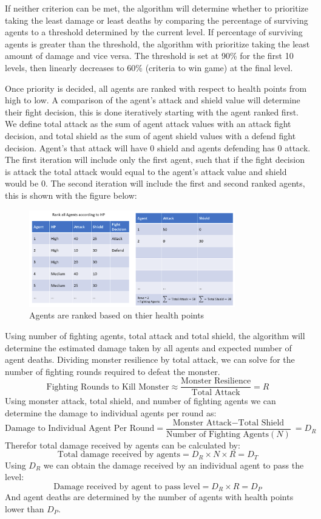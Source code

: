 If neither criterion can be met, the algorithm will determine whether to prioritize taking the least damage or least deaths by comparing the percentage of surviving agents to a threshold determined by the current level. If percentage of surviving agents is greater than the threshold, the algorithm with prioritize taking the least amount of damage and vice versa. The threshold is set at 90\% for the first 10 levels, then linearly decreases to 60\% (criteria to win game) at the final level.

Once priority is decided, all agents are ranked with respect to health points from high to low. A comparison of the agent's attack and shield value will determine their fight decision, this is done iteratively starting with the agent ranked first. We define total attack as the sum of agent attack values with an attack fight decision, and total shield as the sum of agent shield values with a defend fight decision. Agent's that attack will have 0 shield and agents defending has 0 attack. The first iteration will include only the first agent, such that if the fight decision is attack the total attack would equal to the agent's attack value and shield would be 0. The second iteration will include the first and second ranked agents, this is shown with the figure below:

\begin{figure}[htb]
    \centering
    \includegraphics[width=0.8\textwidth]{008_team_5_agent_design/images/Rank-all-Agents-by-hp.png}
    \caption{Agents are ranked based on thier health points}
    \label{rankagents}
\end{figure}

Using number of fighting agents, total attack and total shield, the algorithm will determine the estimated damage taken by all agents and expected number of agent deaths. Dividing monster resilience by total attack, we can solve for the number of fighting rounds required to defeat the monster.
\[\text{Fighting Rounds to Kill Monster} \approx \frac{\text{Monster Resilience}}{\text{Total Attack}}=R\]
Using monster attack, total shield, and number of fighting agents we can determine the damage to individual agents per round as:
\[\text{Damage to Individual Agent Per Round} = \frac{\text{Monster Attack}\mathrm{-}\text{Total Shield}}{\text{Number of Fighting Agents} (N)}\ =D_R\]
Therefor total damage received by agents can be calculated by:
\[\text{Total damage received by agents} = D_R \times N \times R = D_T\]
Using $D_R$ we can obtain the damage received by an individual agent to pass the level:
\[\text{Damage received by agent to pass level} = D_R \times  R = D_P\]
And agent deaths are determined by the number of agents with health points lower than $D_P$.

